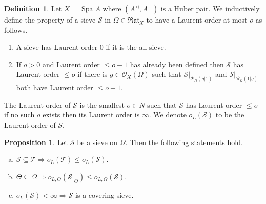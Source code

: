 \documentclass[10pt]{article}
\numberwithin{equation}{section}
\theoremstyle{definition}
\newtheorem{proposition}{Proposition}[subsection]
\newtheorem{definition}{Definition}[subsection]
\DeclareMathOperator{\Spa}{Spa}
\newcommand{\cR}[0]{\mathcal{R}}
\newcommand{\sS}[0]{\mathscr{S}}
\newcommand{\cO}[0]{\mathcal{O}}
\newcommand{\Rat}[0]{\mathfrak{Rat}}
\begin{document}
\begin{definition}
    \label{definition_24_2}
    Let $X=\Spa A$ where $(A^\triangleleft,A^+)$ is a Huber pair. We inductively define the property of a sieve $\sS$ in $\Omega\in\Rat_X$ to have a Laurent order at most $o$ as follows.
    \begin{enumerate}
        \item A sieve has Laurent order $0$ if it is the all sieve.
        \item If $o>0$ and Laurent order $\leq o-1$ has already been defined then $\sS$ has Laurent order $\leq o$ if there is $g\in \cO_X(\Omega)$ such that $\sS|_{\cR_\Omega(g|1)}$ and $\sS|_{\cR_\Omega(1|g)}$ both have Laurent order $\leq o-1$.
    \end{enumerate}
    The Laurent order of $\sS$ is the smallest $o\in N$ such that $\sS$ has Laurent order $\leq o$ if no such $o$ exists then its Laurent order is $\infty$. We denote $o_L(\sS)$ to be the Laurent order of $\sS$.
\end{definition}

\begin{proposition}
    \label{fact_24_1}Let $\sS$ be a sieve on $\Omega$. Then the following statements hold.
    \begin{enumerate}[a.]
        \item $\sS\subseteq\mathcal{T}\Rightarrow o_L(\mathcal{T})\leq o_L(\sS)$.
        \item $\Theta\subseteq\Omega\Rightarrow o_{L,\Theta}(\sS|_\Theta)\leq o_{L,\Omega}(\sS)$.
        \item $o_L(\sS)<\infty\Rightarrow \sS$ is a covering sieve.
    \end{enumerate}
\end{proposition}
\end{document}
